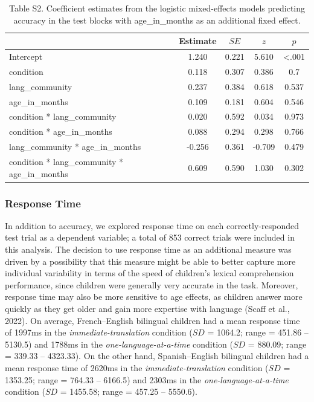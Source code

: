 \documentclass[
  man,floatsintext]{apa7}
\begin{document}
\begin{table}[H]

\begin{center}
\begin{threeparttable}

\caption{\label{tab:unnamed-chunk-6}Table S2. Coefficient estimates from the logistic mixed-effects models predicting accuracy in the test blocks with age\_in\_months as an additional fixed effect.}

\begin{tabular}{lcccc}
\toprule
 & Estimate & $SE$ & $z$ & $p$\\
\midrule
Intercept & 1.240 & 0.221 & 5.610 & <.001\\
condition & 0.118 & 0.307 & 0.386 & 0.7\\
lang\_community & 0.237 & 0.384 & 0.618 & 0.537\\
age\_in\_months & 0.109 & 0.181 & 0.604 & 0.546\\
condition * lang\_community & 0.020 & 0.592 & 0.034 & 0.973\\
condition * age\_in\_months & 0.088 & 0.294 & 0.298 & 0.766\\
lang\_community * age\_in\_months & -0.256 & 0.361 & -0.709 & 0.479\\
condition * lang\_community * age\_in\_months & 0.609 & 0.590 & 1.030 & 0.302\\
\bottomrule
\end{tabular}

\end{threeparttable}
\end{center}

\end{table}

\hypertarget{response-time}{%
\subsubsection{Response Time}\label{response-time}}

In addition to accuracy, we explored response time on each correctly-responded test trial as a dependent variable; a total of 853 correct trials were included in this analysis. The decision to use response time as an additional measure was driven by a possibility that this measure might be able to better capture more individual variability in terms of the speed of children's lexical comprehension performance, since children were generally very accurate in the task. Moreover, response time may also be more sensitive to age effects, as children answer more quickly as they get older and gain more expertise with language (Scaff et al., 2022). On average, French--English bilingual children had a mean response time of 1997ms in the \emph{immediate-translation} condition (\(SD\) = 1064.2; range = 451.86 -- 5130.5) and 1788ms in the \emph{one-language-at-a-time} condition (\(SD\) = 880.09; range = 339.33 -- 4323.33). On the other hand, Spanish--English bilingual children had a mean response time of 2620ms in the \emph{immediate-translation} condition (\(SD\) = 1353.25; range = 764.33 -- 6166.5) and 2303ms in the \emph{one-language-at-a-time} condition (\(SD\) = 1455.58; range = 457.25 -- 5550.6).
\end{document}
